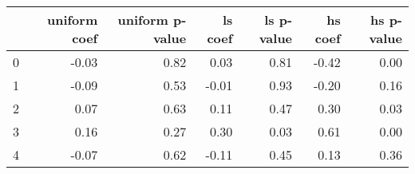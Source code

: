 \begin{tabular}{lrrrrrr}
\toprule
 & uniform coef & uniform p-value & ls coef & ls p-value & hs coef & hs p-value \\
\midrule
0 & -0.03 & 0.82 & 0.03 & 0.81 & -0.42 & 0.00 \\
1 & -0.09 & 0.53 & -0.01 & 0.93 & -0.20 & 0.16 \\
2 & 0.07 & 0.63 & 0.11 & 0.47 & 0.30 & 0.03 \\
3 & 0.16 & 0.27 & 0.30 & 0.03 & 0.61 & 0.00 \\
4 & -0.07 & 0.62 & -0.11 & 0.45 & 0.13 & 0.36 \\
\bottomrule
\end{tabular}
